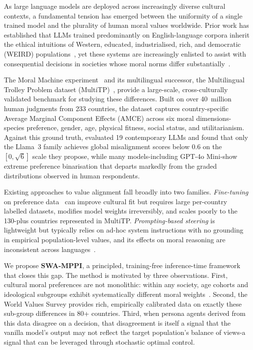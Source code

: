 \documentclass{article}
\begin{document}
As large language models are deployed across increasingly diverse cultural contexts,
a fundamental tension has emerged between the uniformity of a single trained model
and the plurality of human moral values worldwide. Prior work has established that
LLMs trained predominantly on English-language corpora inherit the ethical
intuitions of Western, educated, industrialised, rich, and democratic (WEIRD)
populations~\citep{henrich2010weirdest}, yet these systems are increasingly
enlisted to assist with consequential decisions in societies whose moral norms
differ substantially~\citep{awad2018moral, jin2025multitp}.

The Moral Machine experiment~\citep{awad2018moral} and its multilingual successor,
the Multilingual Trolley Problem dataset (MultiTP)~\citep{jin2025multitp}, provide
a large-scale, cross-culturally validated benchmark for studying these differences.
Built on over 40~million human judgments from 233 countries, the dataset captures
country-specific Average Marginal Component Effects (AMCE) across six moral
dimensions-species preference, gender, age, physical fitness, social status, and
utilitarianism. Against this ground truth, \citet{jin2025multitp} evaluated 19
contemporary LLMs and found that only the Llama~3 family achieves global
misalignment scores below 0.6 on the $[0,\sqrt{6}]$ scale they propose, while
many models-including GPT-4o Mini-show extreme preference binarisation that
departs markedly from the graded distributions observed in human respondents.

Existing approaches to value alignment fall broadly into two families.
\emph{Fine-tuning} on preference data~\citep{bai2022constitutional,
ouyang2022instructgpt} can improve cultural fit but requires large per-country
labelled datasets, modifies model weights irreversibly, and scales poorly to the
130-plus countries represented in MultiTP. \emph{Prompting-based steering} is
lightweight but typically relies on ad-hoc system instructions with no grounding
in empirical population-level values, and its effects on moral reasoning are
inconsistent across languages~\citep{jin2025multitp}.

We propose \textbf{SWA-MPPI}, a principled, training-free inference-time framework
that closes this gap. The method is motivated by three observations. First, cultural
moral preferences are not monolithic: within any society, age cohorts and ideological
subgroups exhibit systematically different moral weights~\citep{awad2018moral,
kleiman2017learning}. Second, the World Values Survey provides rich, empirically
calibrated data on exactly these sub-group differences in 80+ countries. Third,
when persona agents derived from this data disagree on a decision, that disagreement
is itself a signal that the vanilla model's output may not reflect the target
population's balance of views-a signal that can be leveraged through stochastic
optimal control.
\end{document}

